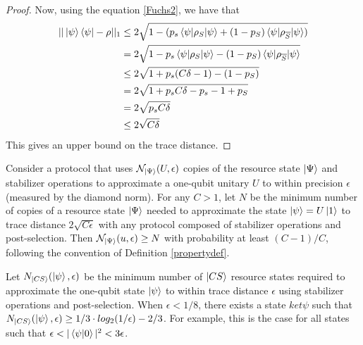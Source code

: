 \documentclass[12pt]{dalthesis}
\begin{document}
\begin{proof}
Now, using the equation \ref{Fuchs2}, we have that 
\begin{equation}
\begin{split}
||\ket{\psi} \bra{\psi} - \rho ||_1 & \leq 2\sqrt{1 - (p_s \braket{\psi | \rho_S | \psi} + (1 - p_S) \braket{\psi | \rho_{\overline{S}} | \psi})} \\
& = 2\sqrt{1 - p_s \braket{\psi | \rho_S | \psi} - (1 - p_S) \braket{\psi | \rho_{\overline{S}} | \psi}} \\
& \leq 2\sqrt{1 + p_s(C\delta - 1) - (1 - p_S)} \\
& = 2\sqrt{1 + p_sC\delta - p_s - 1 + p_S} \\
& = 2\sqrt{p_sC\delta} \\
& \leq 2\sqrt{C\delta}
\end{split}
\end{equation}
This gives an upper bound on the trace distance.
\end{proof}




\begin{lemma}
\label{lemma5.5}
Consider a protocol that uses $\mathcal{N}_{\ket{\Psi}}(U, \epsilon)$ copies of the resource state $\ket{\Psi}$ and stabilizer operations to approximate a one-qubit unitary $U$ to within precision $\epsilon$ (measured by the diamond norm). For any $C>1$, let $N$ be the minimum number of copies of a resource state $\ket{\Psi}$  needed to approximate the state $\ket{\psi} = U\ket{1}$ to trace distance $2\sqrt{C\epsilon}$ with any protocol composed of stabilizer operations and post-selection. Then $\mathcal{N}_{\ket{\Psi}}(u, \epsilon) \geq N$ with probability at least $(C - 1)/C$, following the convention of Definition \ref{propertydef}.
\end{lemma}

\begin{lemma}
\label{lemma5.6}
Let $N_{\ket{CS}}(\ket{\psi}, \epsilon)$ be the minimum number of $\ket{CS}$ resource states required to approximate the one-qubit state $\ket{\psi}$ to within trace distance $\epsilon$ using stabilizer operations and post-selection. When $\epsilon < 1/8$, there exists a state $ket{\psi}$ such that $N_{\ket{CS}}(\ket{\psi}, \epsilon) \geq 1/3 \cdot log_2(1/\epsilon) - 2/3$. For example, this is the case for all states such that $\epsilon <|\braket{\psi | 0}|^2 < 3\epsilon$.
\end{lemma}
\end{document}
